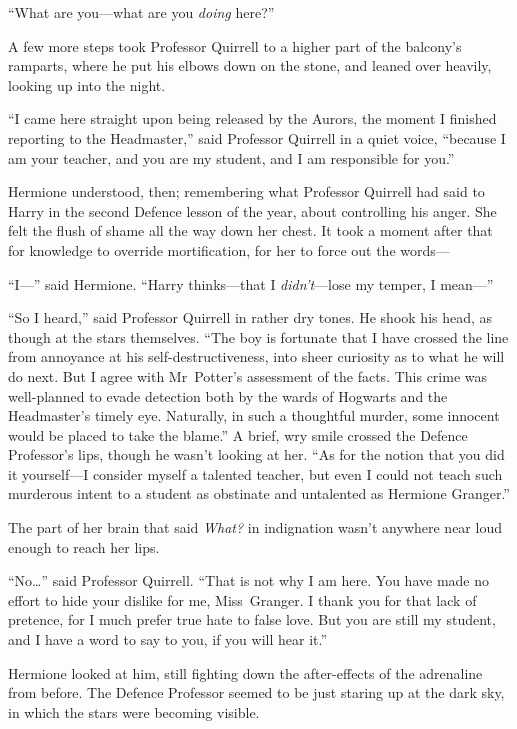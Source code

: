 “What are you—what are you \emph{doing} here?”

A few more steps took Professor Quirrell to a higher part of the balcony’s ramparts, where he put his elbows down on the stone, and leaned over heavily, looking up into the night.

“I came here straight upon being released by the Aurors, the moment I finished reporting to the Headmaster,” said Professor Quirrell in a quiet voice, “because I am your teacher, and you are my student, and I am responsible for you.”

Hermione understood, then; remembering what Professor Quirrell had said to Harry in the second Defence lesson of the year, about controlling his anger. She felt the flush of shame all the way down her chest. It took a moment after that for knowledge to override mortification, for her to force out the words—

“I—” said Hermione. “Harry thinks—that I \emph{didn’t}—lose my temper, I mean—”

“So I heard,” said Professor Quirrell in rather dry tones. He shook his head, as though at the stars themselves. “The boy is fortunate that I have crossed the line from annoyance at his self-destructiveness, into sheer curiosity as to what he will do next. But I agree with Mr~Potter’s assessment of the facts. This crime was well-planned to evade detection both by the wards of Hogwarts and the Headmaster’s timely eye. Naturally, in such a thoughtful murder, some innocent would be placed to take the blame.” A brief, wry smile crossed the Defence Professor’s lips, though he wasn’t looking at her. “As for the notion that you did it yourself—I consider myself a talented teacher, but even I could not teach such murderous intent to a student as obstinate and untalented as Hermione Granger.”

The part of her brain that said \emph{What?} in indignation wasn’t anywhere near loud enough to reach her lips.

“No…” said Professor Quirrell. “That is not why I am here. You have made no effort to hide your dislike for me, Miss~Granger. I thank you for that lack of pretence, for I much prefer true hate to false love. But you are still my student, and I have a word to say to you, if you will hear it.”

Hermione looked at him, still fighting down the after-effects of the adrenaline from before. The Defence Professor seemed to be just staring up at the dark sky, in which the stars were becoming visible.

